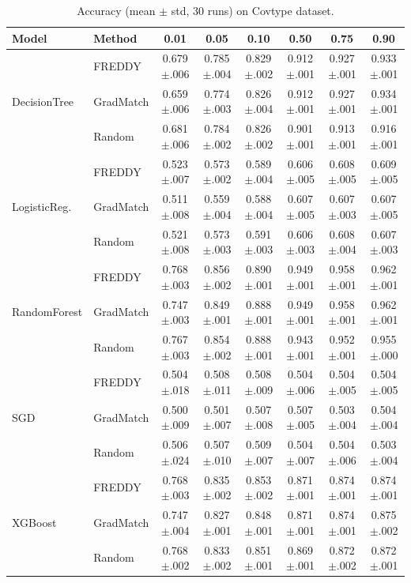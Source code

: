 \documentclass{article}
\begin{document}
\begin{table}[h]
\centering
\caption{Accuracy (mean $\pm$ std, 30 runs) on Covtype dataset.}
\label{tab:acc-covtype}
\small
\begin{tabular}{llcccccc}
\toprule
\textbf{Model} & \textbf{Method} & \textbf{0.01} & \textbf{0.05} & \textbf{0.10} & \textbf{0.50} & \textbf{0.75} & \textbf{0.90} \\
\midrule
\multirow{3}{*}{DecisionTree}
  & FREDDY    & 0.679$\pm$.006 & 0.785$\pm$.004 & 0.829$\pm$.002 & 0.912$\pm$.001 & 0.927$\pm$.001 & 0.933$\pm$.001 \\
  & GradMatch & 0.659$\pm$.006 & 0.774$\pm$.003 & 0.826$\pm$.004 & 0.912$\pm$.001 & 0.927$\pm$.001 & 0.934$\pm$.001 \\
  & Random    & 0.681$\pm$.006 & 0.784$\pm$.002 & 0.826$\pm$.002 & 0.901$\pm$.001 & 0.913$\pm$.001 & 0.916$\pm$.001 \\
\midrule
\multirow{3}{*}{LogisticReg.}
  & FREDDY    & 0.523$\pm$.007 & 0.573$\pm$.002 & 0.589$\pm$.004 & 0.606$\pm$.005 & 0.608$\pm$.005 & 0.609$\pm$.005 \\
  & GradMatch & 0.511$\pm$.008 & 0.559$\pm$.004 & 0.588$\pm$.004 & 0.607$\pm$.005 & 0.607$\pm$.003 & 0.607$\pm$.005 \\
  & Random    & 0.521$\pm$.008 & 0.573$\pm$.003 & 0.591$\pm$.003 & 0.606$\pm$.003 & 0.608$\pm$.004 & 0.607$\pm$.003 \\
\midrule
\multirow{3}{*}{RandomForest}
  & FREDDY    & 0.768$\pm$.003 & 0.856$\pm$.002 & 0.890$\pm$.001 & 0.949$\pm$.001 & 0.958$\pm$.001 & 0.962$\pm$.001 \\
  & GradMatch & 0.747$\pm$.003 & 0.849$\pm$.001 & 0.888$\pm$.001 & 0.949$\pm$.001 & 0.958$\pm$.001 & 0.962$\pm$.001 \\
  & Random    & 0.767$\pm$.003 & 0.854$\pm$.002 & 0.888$\pm$.001 & 0.943$\pm$.001 & 0.952$\pm$.001 & 0.955$\pm$.000 \\
\midrule
\multirow{3}{*}{SGD}
  & FREDDY    & 0.504$\pm$.018 & 0.508$\pm$.011 & 0.508$\pm$.009 & 0.504$\pm$.006 & 0.504$\pm$.005 & 0.504$\pm$.005 \\
  & GradMatch & 0.500$\pm$.009 & 0.501$\pm$.007 & 0.507$\pm$.008 & 0.507$\pm$.005 & 0.503$\pm$.004 & 0.504$\pm$.004 \\
  & Random    & 0.506$\pm$.024 & 0.507$\pm$.010 & 0.509$\pm$.007 & 0.504$\pm$.007 & 0.504$\pm$.006 & 0.503$\pm$.004 \\
\midrule
\multirow{3}{*}{XGBoost}
  & FREDDY    & 0.768$\pm$.003 & 0.835$\pm$.002 & 0.853$\pm$.002 & 0.871$\pm$.001 & 0.874$\pm$.001 & 0.874$\pm$.001 \\
  & GradMatch & 0.747$\pm$.004 & 0.827$\pm$.001 & 0.848$\pm$.001 & 0.871$\pm$.001 & 0.874$\pm$.001 & 0.875$\pm$.002 \\
  & Random    & 0.768$\pm$.002 & 0.833$\pm$.002 & 0.851$\pm$.001 & 0.869$\pm$.001 & 0.872$\pm$.002 & 0.872$\pm$.001 \\
\bottomrule
\end{tabular}
\end{table}
\end{document}
